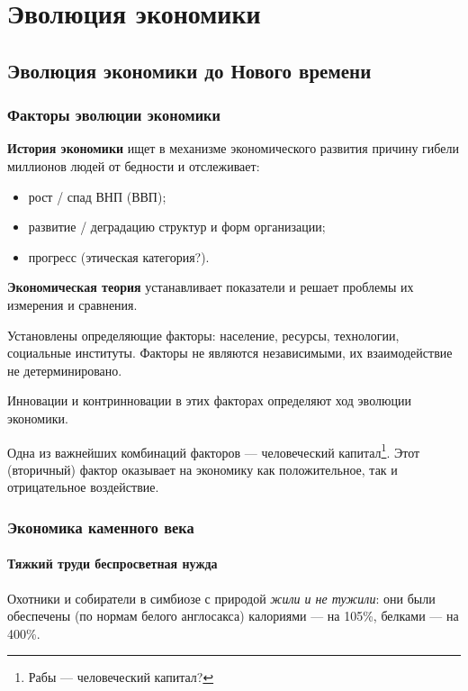 
%
\section[Эволюция экономики]{Эволюция экономики}
\subsection[Эволюция экономики до Нового времени]{Эволюция экономики до Нового времени }
\subsubsection[Факторы эволюции экономики]{Факторы эволюции экономики}
\textbf{История экономики} ищет в механизме экономического развития причину гибели миллионов людей от бедности и
отслеживает:

\begin{itemize}
\item рост / спад ВНП (ВВП);
\item развитие / деградацию структур и форм организации;
\item прогресс (этическая категория?).
\end{itemize}

\textbf{Экономическая теория} устанавливает показатели и решает проблемы их измерения и сравнения.

Установлены определяющие факторы: население, ресурсы, технологии, социальные институты. Факторы не являются
независимыми, их взаимодействие не детерминировано.

Инновации и контринновации в этих факторах определяют ход эволюции экономики.

Одна из важнейших комбинаций факторов — человеческий капитал\footnote{Рабы — человеческий капитал?}.
Этот (вторичный) фактор оказывает на экономику как положительное, так и отрицательное воздействие.

\subsubsection[Экономика каменного века]{Экономика каменного века}
\paragraph[\flqq Тяжкий труд\frqq и \flqq беспросветная нужда\frqq]{\flqq Тяжкий труд\frqq и \flqq беспросветная нужда\frqq}
Охотники и собиратели в симбиозе с природой \textit{жили и не тужили}: они были обеспечены (по нормам белого англосакса)
калориями — на 105\%, белками — на 400\%.

